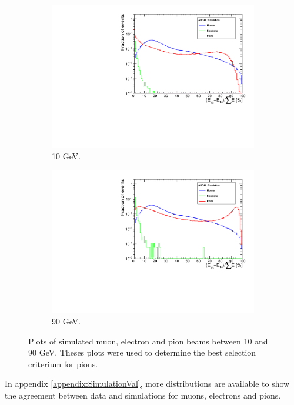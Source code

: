 \begin{figure}[htbp!]
\begin{subfigure}[t]{0.5\textwidth}
		\includegraphics[width=1\linewidth]{../Thesis_Plots/Timing/Pions/Plots/SelectionCut_EnergyLastLayers_10GeV}
		\caption{10 GeV.} \label{fig:pi10GeV_Elast}
	\end{subfigure}
	\hfill
	\begin{subfigure}[t]{0.5\textwidth}
		\centering
		\includegraphics[width=1\linewidth]{../Thesis_Plots/Timing/Pions/Plots/SelectionCut_EnergyLastLayers_90GeV}
		\caption{90 GeV.} \label{fig:pi90GeV_Elast}
	\end{subfigure}
	\caption{Plots of simulated muon, electron and pion beams between 10 and 90 GeV. Theses plots were used to determine the best selection criterium for pions.} \label{fig:pionselection}
\end{figure}

In appendix \ref{appendix:SimulationVal}, more distributions are available to show the agreement between data and simulations for muons, electrons and pions.

